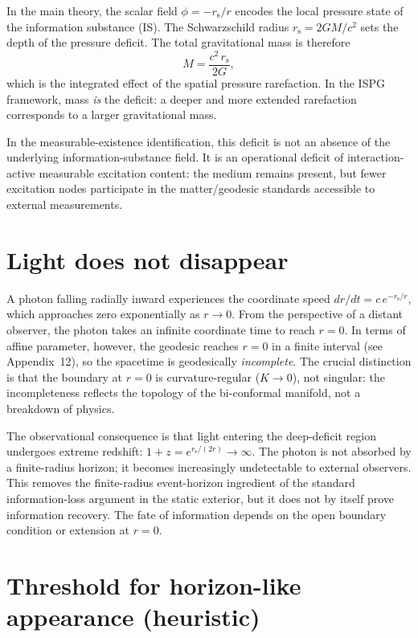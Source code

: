 \documentclass[11pt]{article}
\newcommand{\rs}{r_{\mathrm{s}}}
\begin{document}
In the main theory, the scalar field $\phi = -\rs/r$ encodes the local pressure state of the information substance (IS). The Schwarzschild radius $\rs = 2GM/c^2$ sets the depth of the pressure deficit. The total gravitational mass is therefore
\begin{equation}
M = \frac{c^2\,\rs}{2G},
\end{equation}
which is the integrated effect of the spatial pressure rarefaction. In the ISPG framework, mass \emph{is} the deficit: a deeper and more extended rarefaction corresponds to a larger gravitational mass.

In the measurable-existence identification, this deficit is not an absence
of the underlying information-substance field.  It is an operational deficit
of interaction-active measurable excitation content: the medium remains
present, but fewer excitation nodes participate in the matter/geodesic
standards accessible to external measurements.

\section{Light does not disappear}\label{sec:light}

A photon falling radially inward experiences the coordinate speed $dr/dt = c\,e^{-\rs/r}$, which approaches zero exponentially as $r \to 0$. From the perspective of a distant observer, the photon takes an infinite coordinate time to reach $r = 0$. In terms of affine parameter, however, the geodesic reaches $r = 0$ in a finite interval (see Appendix~12), so the spacetime is geodesically \emph{incomplete}. The crucial distinction is that the boundary at $r = 0$ is curvature-regular ($K \to 0$), not singular: the incompleteness reflects the topology of the bi-conformal manifold, not a breakdown of physics.

The observational consequence is that light entering the deep-deficit region undergoes extreme redshift: $1 + z = e^{\rs/(2r)} \to \infty$. The photon is not absorbed by a finite-radius horizon; it becomes increasingly undetectable to external observers. This removes the finite-radius event-horizon ingredient of the standard information-loss argument in the static exterior, but it does not by itself prove information recovery. The fate of information depends on the open boundary condition or extension at $r = 0$.

\section{Threshold for horizon-like appearance (heuristic)}\label{sec:minmass}
\end{document}

